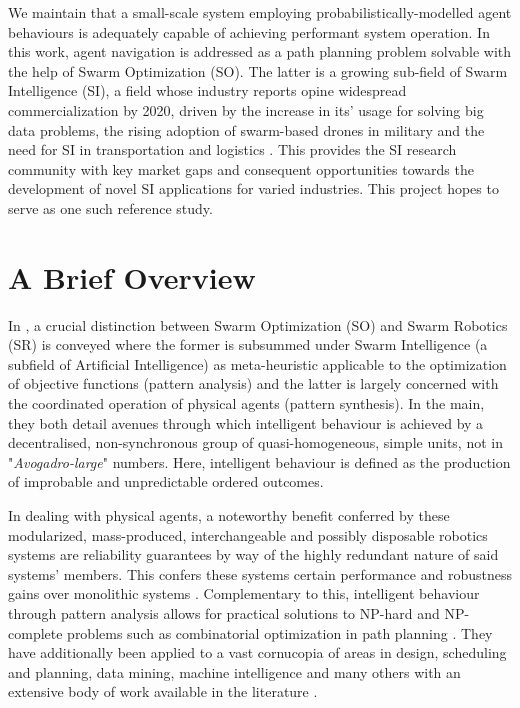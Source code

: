 \documentclass{report}
\begin{document}
We maintain that a small-scale system employing probabilistically-modelled agent behaviours is adequately capable of achieving performant system operation. In this work, agent navigation is addressed as a path planning problem solvable with the help of Swarm Optimization (SO). The latter is a growing sub-field of Swarm Intelligence (SI), a field whose industry reports opine widespread commercialization by 2020, driven by the increase in its' usage for solving big data problems, the rising adoption of swarm-based drones in military and the need for SI in transportation and logistics \cite{Swarm2030}. This provides the SI research community with key market gaps and consequent opportunities towards the development of novel SI applications for varied industries. This project hopes to serve as one such reference study.

\section{A Brief Overview}
In \cite{Beni2005a}, a crucial distinction between Swarm Optimization (SO) and Swarm Robotics (SR) is conveyed where the former is subsummed under Swarm Intelligence (a subfield of Artificial Intelligence) as meta-heuristic applicable to the optimization of objective functions (pattern analysis) and the latter is largely concerned with the coordinated operation of physical agents (pattern synthesis). In the main, they both detail avenues through which intelligent behaviour is achieved by a decentralised, non-synchronous group of quasi-homogeneous, simple units, not in "\textit{Avogadro-large}" numbers. Here, intelligent behaviour is defined as the production of improbable and unpredictable ordered outcomes.

In dealing with physical agents, a noteworthy benefit conferred by these modularized, mass-produced, interchangeable and possibly disposable robotics systems are reliability guarantees by way of the highly redundant nature of said systems' members. This confers these systems certain performance and robustness gains over monolithic systems \cite{Iocchi2001}. Complementary to this, intelligent behaviour through pattern analysis allows for practical solutions to NP-hard and NP-complete problems such as combinatorial optimization in path planning \cite{Yan2012}. They have additionally been applied to a vast cornucopia of areas in design, scheduling and planning, data mining, machine intelligence and many others with an extensive body of work available in the literature \cite{Yang2011}.
\end{document}
